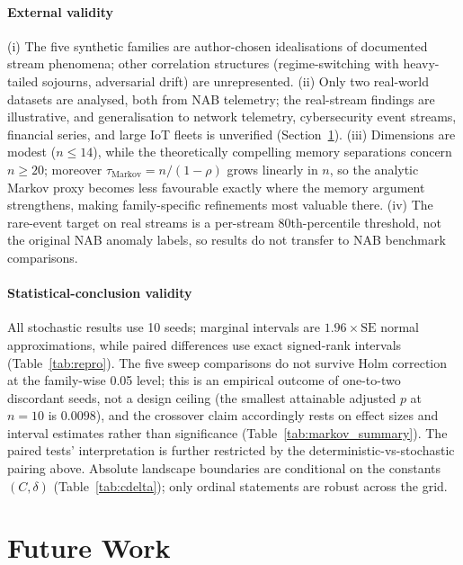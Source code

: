 \documentclass[sensors,article,submit,pdftex,moreauthors]{Definitions/mdpi}
\begin{document}
\paragraph{External validity} (i) The five synthetic families are author-chosen idealisations of documented stream phenomena; other correlation structures (regime-switching with heavy-tailed sojourns, adversarial drift) are unrepresented. (ii) Only two real-world datasets are analysed, both from NAB telemetry; the real-stream findings are illustrative, and generalisation to network telemetry, cybersecurity event streams, financial series, and large IoT fleets is unverified (Section~\ref{sec:future_work}). (iii) Dimensions are modest ($n \leq 14$), while the theoretically compelling memory separations concern $n \geq 20$; moreover $\tau_{\text{Markov}} = n/(1-\rho)$ grows linearly in $n$, so the analytic Markov proxy becomes less favourable exactly where the memory argument strengthens, making family-specific refinements most valuable there. (iv) The rare-event target on real streams is a per-stream 80th-percentile threshold, not the original NAB anomaly labels, so results do not transfer to NAB benchmark comparisons.

\paragraph{Statistical-conclusion validity} All stochastic results use 10 seeds; marginal intervals are $1.96 \times \mathrm{SE}$ normal approximations, while paired differences use exact signed-rank intervals (Table~\ref{tab:repro}). The five sweep comparisons do not survive Holm correction at the family-wise 0.05 level; this is an empirical outcome of one-to-two discordant seeds, not a design ceiling (the smallest attainable adjusted $p$ at $n = 10$ is $0.0098$), and the crossover claim accordingly rests on effect sizes and interval estimates rather than significance (Table~\ref{tab:markov_summary}). The paired tests' interpretation is further restricted by the deterministic-vs-stochastic pairing above. Absolute landscape boundaries are conditional on the constants $(C, \delta)$ (Table~\ref{tab:cdelta}); only ordinal statements are robust across the grid.


\section{Future Work}
\label{sec:future_work}
\end{document}
